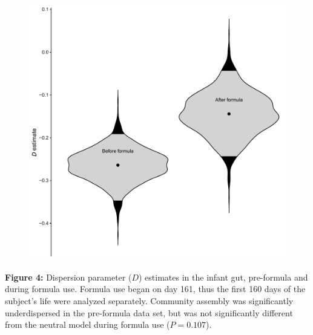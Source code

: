 \documentclass{article}
\begin{document}
{\begin{figure}[t]
	\centering
	\includegraphics[scale=0.80]{figs/Fig_4.pdf}
\end{figure}
\textbf{Figure 4:}\label{sec:figure4} Dispersion parameter (\(D\)) estimates in the infant gut, pre-formula and during formula use. Formula use began on day 161, thus the first 160 days of the subject's life were analyzed separately. Community assembly was significantly underdispersed in the pre-formula data set, but was not significantly different from the neutral model during formula use (\(P = 0.107\)).
\newpage

}%




\newpage
\end{document}
